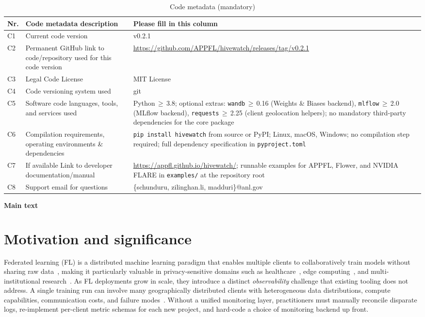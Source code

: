 \documentclass[preprint,12pt, a4paper]{elsarticle}
\begin{document}
\begin{table}[!h]
\begin{tabular}{|l|p{4.5cm}|p{7.5cm}|}
\hline
\textbf{Nr.} & \textbf{Code metadata description} & \textbf{Please fill in this column} \\
\hline
C1 & Current code version & v0.2.1 \\
\hline
C2 & Permanent GitHub link to code/repository used for this code version & \url{https://github.com/APPFL/hivewatch/releases/tag/v0.2.1} \\
\hline
C3 & Legal Code License   & MIT License \\
\hline
C4 & Code versioning system used & git \\
\hline
C5 & Software code languages, tools, and services used & Python\,$\geq$\,3.8; optional extras: \texttt{wandb}\,$\geq$\,0.16 (Weights \& Biases backend), \texttt{mlflow}\,$\geq$\,2.0 (MLflow backend), \texttt{requests}\,$\geq$\,2.25 (client geolocation helpers); no mandatory third-party dependencies for the core package \\
\hline
C6 & Compilation requirements, operating environments \& dependencies & \texttt{pip install hivewatch} from source or PyPI; Linux, macOS, Windows; no compilation step required; full dependency specification in \texttt{pyproject.toml} \\
\hline
C7 & If available Link to developer documentation/manual & \url{https://appfl.github.io/hivewatch/}; runnable examples for APPFL, Flower, and NVIDIA FLARE in \texttt{examples/} at the repository root \\
\hline
C8 & Support email for questions & \{schunduru, zilinghan.li, madduri\}@anl.gov \\
\hline
\end{tabular}
\caption{Code metadata (mandatory)}
\label{tab:codemeta}
\end{table}

\textbf{Main text}\\

\section{Motivation and significance}
\label{sec:motivation}
Federated learning (FL) is a distributed machine learning paradigm that enables multiple clients to collaboratively train models without sharing raw data~\cite{mcmahan2017communication}, making it particularly valuable in privacy-sensitive domains such as healthcare~\cite{rieke2020future}, edge computing~\cite{lim2020federated}, and multi-institutional research~\cite{kairouz2021advances}. As FL deployments grow in scale, they introduce a distinct \emph{observability} challenge that existing tooling does not address. A single training run can involve many geographically distributed clients with heterogeneous data distributions, compute capabilities, communication costs, and failure modes~\cite{li2020federated}. Without a unified monitoring layer, practitioners must manually reconcile disparate logs, re-implement per-client metric schemas for each new project, and hard-code a choice of monitoring backend up front.
\end{document}
